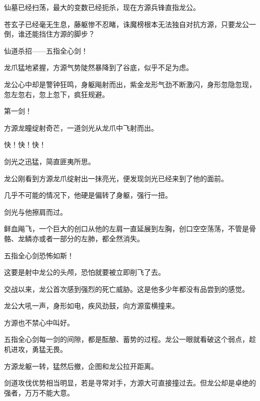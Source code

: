 \begin{this_body}
仙墓已经扫荡，最大的变数已经扼杀，现在方源兵锋直指龙公。

苍玄子已经毫无生息，藤躯惨不忍睹，诛魔榜根本无法独自对抗方源，只要龙公一倒，谁还能挡住方源的脚步？

仙道杀招——五指全心剑！

龙爪猛地紧握，方源气势陡然暴降到了谷底，似乎不足为虑。

龙公心中却是警钟狂鸣，身躯飚射而出，紫金龙形气劲不断激闪，身形忽隐忽现，忽左忽右，忽上忽下，疯狂规避。

第一剑！

方源龙瞳绽射奇芒，一道剑光从龙爪中飞射而出。

快！快！快！

剑光之迅猛，简直匪夷所思。

龙公刚看到方源龙爪绽射出一抹亮光，便发现剑光已经来到了他的面前。

几乎不可能的情况下，他硬是偏转了身躯，强行一扭。

剑光与他擦肩而过。

鲜血飚飞，一个巨大的创口从他的左肩一直延展到左胸，创口空空荡荡，不管是骨骼、龙鳞亦或者一部分的左肺，都全然消失。

五指全心剑恐怖如斯！

这要是射中龙公的头颅，恐怕就要被立即削飞了去。

交战以来，龙公首次感到强烈的死亡威胁。这是他多少年都没有品尝到的感觉。

龙公大吼一声，身形如电，疾风劲鼓，向方源蛮横撞来。

方源也不禁心中叫好。

五指全心剑每一剑的间隙，都是酝酿、蓄势的过程。龙公一眼就看破这个弱点，趁机进攻，勇猛无畏。

方源龙躯一转，猛然后撤，企图和龙公拉开距离。

剑道攻伐优势相当明显，若是寻常对手，方源大可直接撞过去。但龙公却是卓绝的强者，万万不能大意。

\end{this_body}

